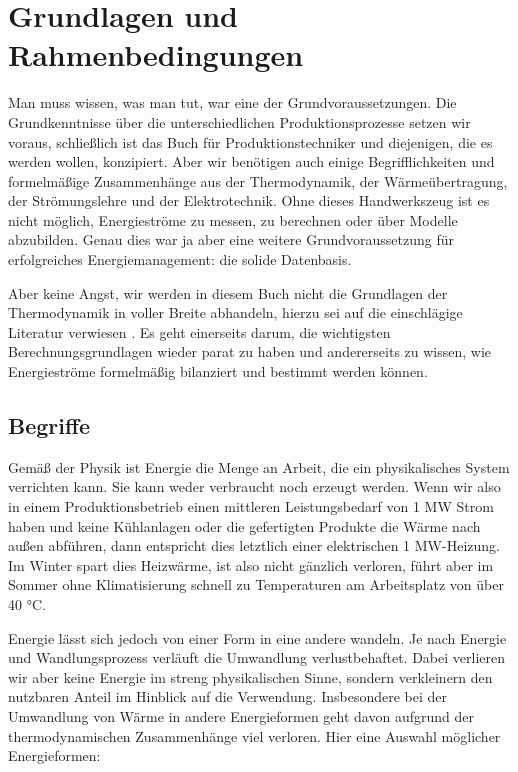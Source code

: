 \chapter{Grundlagen und Rahmenbedingungen}
\label{cptr:Kapitel2}

Man muss wissen, was man tut, war eine der Grundvoraussetzungen. Die Grundkenntnisse über die unterschiedlichen Produktionsprozesse setzen wir voraus, schließlich ist das Buch für Produktionstechniker und diejenigen, die es werden wollen, konzipiert. Aber wir benötigen auch einige Begrifflichkeiten und formelmäßige Zusammenhänge aus der Thermodynamik, der Wärmeübertragung, der Strömungslehre und der Elektrotechnik. Ohne dieses Handwerkszeug ist es nicht möglich, Energieströme zu messen, zu berechnen oder über Modelle abzubilden. Genau dies war ja aber eine weitere Grundvoraussetzung für erfolgreiches Energiemanagement:
die solide Datenbasis.\par\bigskip				%

Aber keine Angst, wir werden in diesem Buch nicht die Grundlagen der Thermodynamik in voller Breite abhandeln, hierzu sei auf die einschlägige Literatur verwiesen  \parencites{Baehr.2008}{Iben.1999}{Schmidt.1975}. Es geht einerseits darum, die wichtigsten Berechnungsgrundlagen wieder parat zu haben und andererseits zu wissen, wie Energieströme formelmäßig bilanziert und bestimmt werden können.\par\bigskip



\section{Begriffe}
\label{sec:Begriffe}

Gemäß der Physik ist Energie die Menge an Arbeit, die ein physikalisches System verrichten kann. Sie kann weder verbraucht noch erzeugt werden. Wenn wir also in einem Produktionsbetrieb einen mittleren Leistungsbedarf von 1 MW Strom haben und keine Kühlanlagen oder die gefertigten Produkte die Wärme nach außen abführen, dann entspricht dies letztlich einer elektrischen 1 MW-Heizung. Im Winter spart dies Heizwärme, ist also nicht gänzlich verloren, führt aber im Sommer ohne Klimatisierung schnell zu Temperaturen am Arbeitsplatz von über 40 °C.\par\bigskip

Energie lässt sich jedoch von einer Form in eine andere wandeln. Je nach Energie und Wandlungsprozess verläuft die Umwandlung verlustbehaftet. Dabei verlieren wir aber keine Energie im streng physikalischen Sinne, sondern verkleinern den nutzbaren Anteil im Hinblick auf die Verwendung. Insbesondere bei der Umwandlung von Wärme in andere Energieformen geht davon aufgrund der thermodynamischen Zusammenhänge viel verloren. Hier eine Auswahl möglicher Energieformen:

